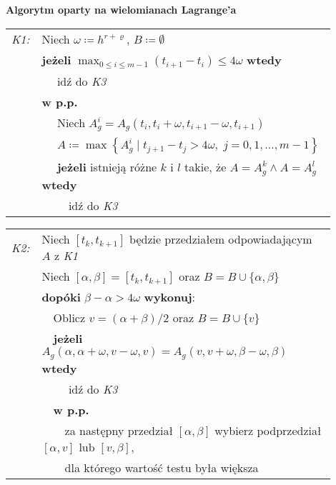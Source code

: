 \documentclass[oik, pdftex, robocza, man]{mgrwms}
\begin{document}
    \vspace{10pt}
    \begin{table}[H]
        \begin{center}
            \textbf{Algorytm oparty na wielomianach Lagrange'a}            
        \end{center}

        \begin{tabular}{p{0.045\linewidth} p{0.85\linewidth}}
            \textit{K1:}    & Niech $\omega \coloneqq h^{r+\varrho}$, $B \coloneqq \emptyset$ \\
                            & \textbf{jeżeli} \(\displaystyle \max_{0 \leq i \leq m-1} (t_{i+1} - t_{i}) \leq 4\omega \) \textbf{wtedy} \\
                            & $\quad$ idź do \textit{K3} \\
                            & \textbf{w p.p.} \\
                            & $\quad$ Niech $A_{g}^{i} = A_{g}\left(t_{i}, t_{i}+\omega, t_{i+1}-\omega, t_{i+1}\right)$ \\
                            & $\quad$ $A\coloneqq\max \left\{A_{g}^{i} \mid t_{j+1}-t_{j}>4 \omega,\; j=0,1, \ldots, m-1 \right\}$ \\
                            & $\quad$ \textbf{jeżeli} istnieją różne $k$ i $l$ takie, że $A = A_{g}^{k} \land A = A_{g}^{l}$ \textbf{wtedy} \\
                            & $\quad\quad$ idź do \textit{K3} \\
        \end{tabular}
    \end{table} \vspace{-20pt}
    \begin{table}[H]
        \begin{tabular}{p{0.045\linewidth} p{0.85\linewidth}}
        \textit{K2:}    & Niech $[t_{k}, t_{k+1}]$ będzie przedziałem odpowiadającym $A$ z \textit{K1} \\
                        & Niech $[\alpha,\beta] = [t_{k}, t_{k+1}]$ oraz $B = B \cup \{\alpha, \beta\}$ \\
                        & \textbf{dopóki} $\beta - \alpha > 4\omega$ \textbf{wykonuj}: \\
                        & $\quad$Oblicz $v = (\alpha + \beta) / 2$ oraz $B = B \cup \{v\}$ \\
                        & $\quad$\textbf{jeżeli} $A_{g}(\alpha, \alpha + \omega, v - \omega, v) = A_{g}(v, v + \omega, \beta - \omega, \beta)$ \textbf{wtedy} \\
                        & $\quad$$\quad$ idź do \textit{K3} \\
                        & $\quad$\textbf{w p.p.} \\
                        & $\quad$$\quad$za następny przedział $[\alpha, \beta]$ wybierz podprzedział $[\alpha, v]$ lub $[v, \beta]$, \\
                        & $\quad$$\quad$dla którego wartość testu była większa \\
        \end{tabular}
    \end{table} \vspace{-20pt}
\end{document}
